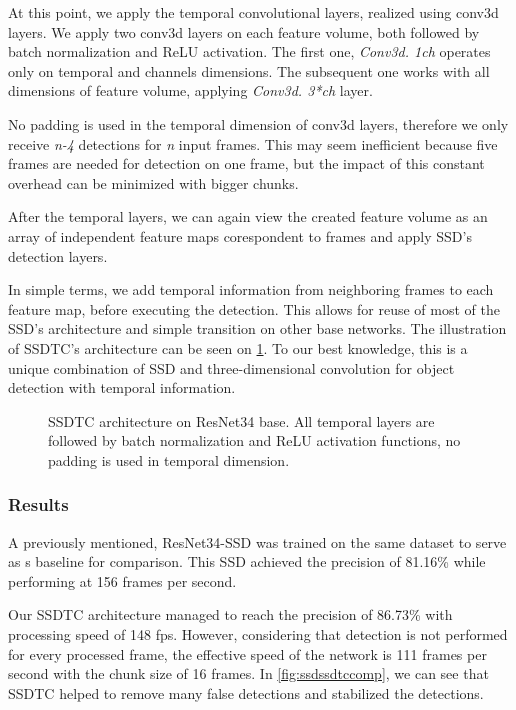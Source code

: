 At this point, we apply the temporal convolutional layers, realized using conv3d layers. We apply two conv3d layers on each feature volume, both followed by batch normalization and ReLU activation.  The first one, \textit{Conv3d. 1\x ch} operates only on temporal and channels dimensions.  The subsequent one works with all dimensions of feature volume, applying \textit{Conv3d. 3*ch} layer. 

No padding is used in the temporal dimension of conv3d layers, therefore we only receive \textit{n-4} detections for \textit{n} input frames. This may seem inefficient because five frames are needed for detection on one frame, but the impact of this constant overhead can be minimized with bigger chunks. 

After the temporal layers, we can again view the created feature volume as an array of independent feature maps corespondent to frames and apply SSD's detection layers. 

In simple terms, we add temporal information from neighboring frames to each feature map, before executing the detection. This allows for reuse of most of the SSD's architecture and simple transition on other base networks. The illustration of SSDTC's architecture can be seen on \cref{fig:ssdtc}. To our best knowledge, this is a unique combination of SSD and three-dimensional convolution for object detection with temporal information.

\begin{figure}
    \centering
    \ssdtc
    \caption[Single Shot Detector with Temporal Convolution (SSDTC)]{SSDTC architecture on ResNet34 base. All temporal layers are followed by batch normalization and ReLU activation functions, no padding is used in temporal dimension.}
    \label{fig:ssdtc}
\end{figure}


\subsubsection{Results}
A previously mentioned, ResNet34-SSD was trained on the same dataset to serve as s baseline for comparison. This SSD achieved the precision of 81.16\% while performing at 156 frames per second. 

Our SSDTC architecture managed to reach the precision of 86.73\% with processing speed of 148 fps. However, considering that detection is not performed for every processed frame, the effective speed of the network is 111 frames per second with the chunk size of 16 frames. 
In \cref{fig:ssdssdtccomp}, we can see that SSDTC helped to remove many false detections and stabilized the detections.

